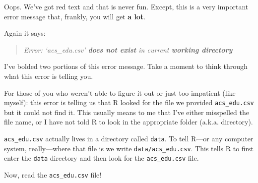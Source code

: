 \documentclass[
]{book}
\begin{document}
Oops. We've got red text and that is never fun. Except, this is a very important error message that, frankly, you will get \textbf{a lot}.

Again it says:

\begin{quote}
\emph{Error: `acs\_edu.csv' \textbf{does not exist} in current \textbf{working directory}}
\end{quote}

I've bolded two portions of this error message. Take a moment to think through what this error is telling you.

For those of you who weren't able to figure it out or just too impatient (like myself): this error is telling us that R looked for the file we provided \texttt{acs\_edu.csv} but it could not find it. This usually means to me that I've either misspelled the file name, or I have not told R to look in the appropriate folder (a.k.a. directory).

\texttt{acs\_edu.csv} actually lives in a directory called \texttt{data}. To tell R---or any computer system, really---where that file is we write \texttt{data/acs\_edu.csv}. This tells R to first enter the \texttt{data} directory and then look for the \texttt{acs\_edu.csv} file.

Now, read the \texttt{acs\_edu.csv} file!
\end{document}
